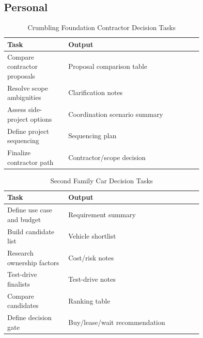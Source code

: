 \documentclass[custom, sidenote, final]{cls/oneproposal}
\begin{document}
\subsection{Personal}

\begin{table}[htbp]
    \centering
    \footnotesize
    \caption{Crumbling Foundation Contractor Decision Tasks}\label{tab:foundation-tasks}
    \begin{tabular}{m{0.25\linewidth} p{0.55\linewidth}}
        \toprule
        \textbf{Task}                & \textbf{Output}               \\
        \midrule
        Compare contractor proposals & Proposal comparison table     \\
        \midrule

        Resolve scope ambiguities    & Clarification notes           \\
        \midrule

        Assess side-project options  & Coordination scenario summary \\
        \midrule

        Define project sequencing    & Sequencing plan               \\
        \midrule

        Finalize contractor path     & Contractor/scope decision     \\
        \bottomrule
    \end{tabular}
\end{table}


\begin{table}[htbp]
    \centering
    \footnotesize
    \caption{Second Family Car Decision Tasks}\label{tab:car-tasks}
    \begin{tabular}{m{0.25\linewidth} p{0.55\linewidth}}
        \toprule
        \textbf{Task}              & \textbf{Output}               \\
        \midrule
        Define use case and budget & Requirement summary           \\
        \midrule
        Build candidate list       & Vehicle shortlist             \\
        \midrule
        Research ownership factors & Cost/risk notes               \\
        \midrule
        Test-drive finalists       & Test-drive notes              \\
        \midrule
        Compare candidates         & Ranking table                 \\
        \midrule
        Define decision gate       & Buy/lease/wait recommendation \\
        \bottomrule
    \end{tabular}
\end{table}
\end{document}
